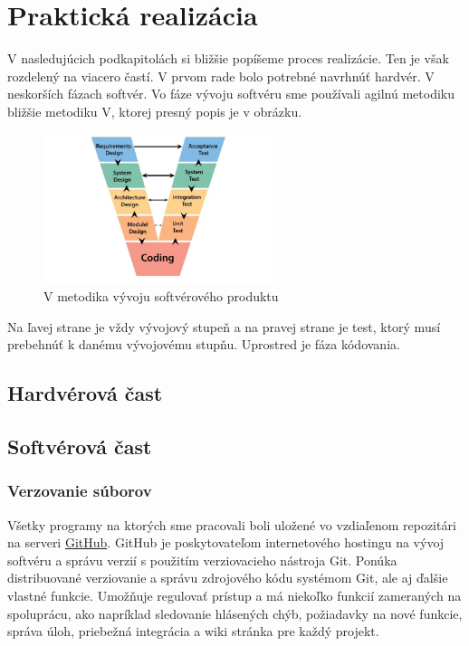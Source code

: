 \chapter{Praktická realizácia}
V nasledujúcich podkapitolách si bližšie popíšeme proces realizácie. Ten je však rozdelený na viacero častí. V prvom rade bolo potrebné navrhnúť hardvér. V neskorších fázach softvér. Vo fáze vývoju softvéru sme používali agilnú metodiku bližšie metodiku V, ktorej presný popis je v obrázku.

\begin{figure}[h!]
    \centering
    \includegraphics[width=0.6\textwidth]{obrazky/V_model.jpg}
    \caption{V metodika vývoju softvérového produktu}
\end{figure}
Na ľavej strane je vždy vývojový stupeň a na pravej strane je test, ktorý musí prebehnúť k danému vývojovému stupňu. Uprostred je fáza kódovania. 

\section{Hardvérová čast}
\section{Softvérová čast}
\subsection{Verzovanie súborov}
Všetky programy na ktorých sme pracovali boli uložené vo vzdiaľenom repozitári na serveri \href{https://www.github.com}{GitHub}. GitHub je poskytovateľom internetového hostingu na vývoj softvéru a správu verzií s použitím verziovacieho nástroja Git. Ponúka distribuované verziovanie a správu zdrojového kódu systémom Git, ale aj ďalšie vlastné funkcie. Umožňuje regulovať prístup a má niekoľko funkcií zameraných na spoluprácu, ako napríklad sledovanie hlásených chýb, požiadavky na nové funkcie, správa úloh, priebežná integrácia a wiki stránka pre každý projekt.
